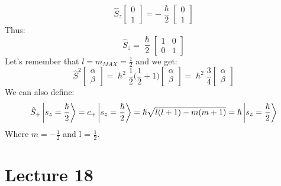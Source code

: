 \documentclass{article}
\begin{document}
$$\hat{S}_z \begin{bmatrix} 0 \\ 1 \end{bmatrix} = -\frac{\hslash}{2} \begin{bmatrix} 0 \\ 1 \end{bmatrix}$$
Thus:
$$\hat{S}_z = \frac{\hslash}{2} \begin{bmatrix}1 & 0 \\0 & 1 \end{bmatrix}
$$
Let's remember that $l = m_{MAX} = \frac{1}{2}$ and  we get:
$$\hat{S}^2  \begin{bmatrix} \alpha \\ \beta \end{bmatrix} = \hslash^2 \frac{1}{2} \biggl( \frac{1}{2} + 1 \biggl)   \begin{bmatrix} \alpha \\ \beta \end{bmatrix}  = \hslash^2 \frac{3}{4}  \begin{bmatrix} \alpha \\ \beta \end{bmatrix}$$
We can also define:
$$\hat{S}_+ \ket{ s_z = \frac{\hslash}{2}} = c_+ \ket{s_z = \frac{\hslash}{2}} = \hslash \sqrt{l(l+1)-m(m+1)} = \hslash \ket{s_z = \frac{\hslash}{2}}$$
Where $m= -\frac{1}{2}$ and l = $\frac{1}{2}$.

\section{Lecture 18}
\end{document}
